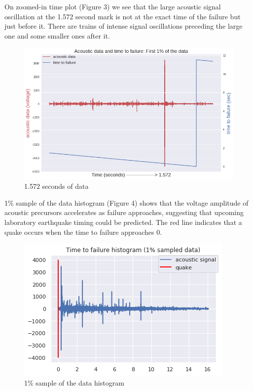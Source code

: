 \documentclass[]{llncs} %
\begin{document}
On zoomed-in time plot (Figure 3) we see that the large acoustic signal oscillation at the 1.572 second mark is not at the exact time of the failure but just before it. There are trains of intense signal oscillations preceding the large one and some smaller ones after it.\par
\begin{figure}
	\centering
	\includegraphics[width=.9\linewidth]{zoomedInTimePLot}
	\caption{1.572 seconds of data}
	\label{fig:zoomeInTimePlot}
\end{figure}

1\% sample of the data histogram (Figure 4) shows that the voltage amplitude of acoustic precursors accelerates as failure approaches, suggesting that upcoming laboratory earthquake timing could be predicted. The red line indicates that a quake occurs when the time to failure approaches 0. \par
\begin{figure}
	\centering
	\includegraphics[width=.8\linewidth]{timeToFailureHistogram}
	\caption{1\% sample of the data histogram}
	\label{fig:timeToFailureHistogram}
\end{figure}
\end{document}
